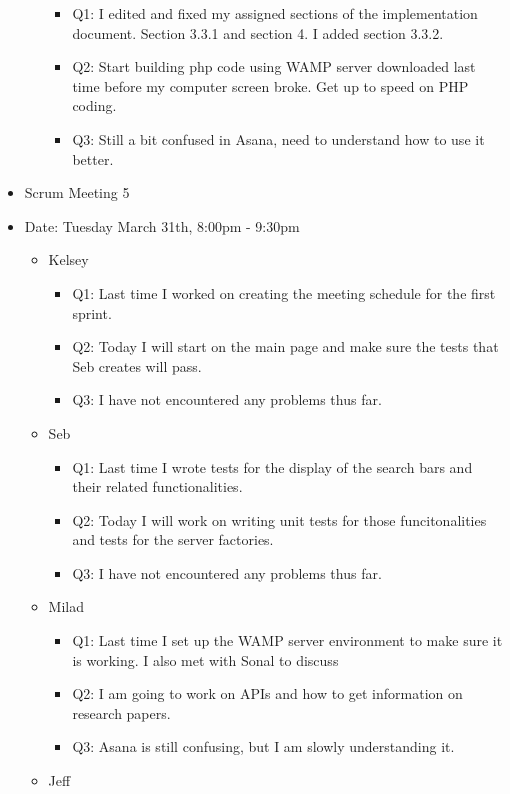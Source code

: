 \documentclass[]{article}
\begin{document}
\begin{itemize}
\begin{itemize}
    \begin{itemize}
    \itemsep1pt\parskip0pt
    \item
      Q1: I edited and fixed my assigned sections of the implementation
      document. Section 3.3.1 and section 4. I added section 3.3.2.
    \item
      Q2: Start building php code using WAMP server downloaded last time
      before my computer screen broke. Get up to speed on PHP coding.
    \item
      Q3: Still a bit confused in Asana, need to understand how to use
      it better.
    \end{itemize}
  \end{itemize}
\item
  Scrum Meeting 5
\item
  Date: Tuesday March 31th, 8:00pm - 9:30pm

  \begin{itemize}
  \itemsep1pt\parskip0pt
  \item
    Kelsey

    \begin{itemize}
    \itemsep1pt\parskip0pt
    \item
      Q1: Last time I worked on creating the meeting schedule for the
      first sprint.
    \item
      Q2: Today I will start on the main page and make sure the tests
      that Seb creates will pass.
    \item
      Q3: I have not encountered any problems thus far.
    \end{itemize}
  \item
    Seb

    \begin{itemize}
    \itemsep1pt\parskip0pt
    \item
      Q1: Last time I wrote tests for the display of the search bars and
      their related functionalities.
    \item
      Q2: Today I will work on writing unit tests for those
      funcitonalities and tests for the server factories.
    \item
      Q3: I have not encountered any problems thus far.
    \end{itemize}
  \item
    Milad

    \begin{itemize}
    \itemsep1pt\parskip0pt
    \item
      Q1: Last time I set up the WAMP server environment to make sure it
      is working. I also met with Sonal to discuss
    \item
      Q2: I am going to work on APIs and how to get information on
      research papers.
    \item
      Q3: Asana is still confusing, but I am slowly understanding it.
    \end{itemize}
  \item
    Jeff


\end{itemize}
\end{itemize}
\end{document}
